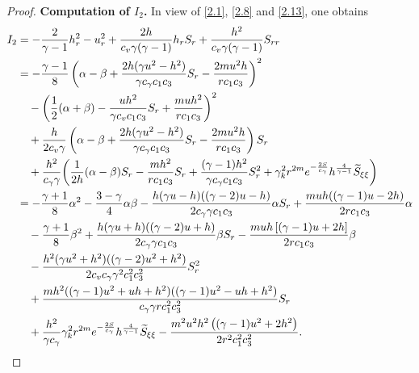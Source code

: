 \documentclass[11pt,reqno]{article}
\numberwithin{equation}{section}
\begin{document}
\begin{proof}
\noindent\textbf{Computation of $I_2$.}
In view of \eqref{2.1}, \eqref{2.8} and \eqref{2.13}, one obtains
\begin{align}
I_2 &=-\frac{2}{\gamma-1}h_r^2-u_r^2+\frac{2h}{c_v\gamma(\gamma-1)}h_rS_r
  +\frac{h^2}{c_v\gamma(\gamma-1)}S_{rr}\nonumber\\
  &= -\frac{\gamma-1}{8} \left( \alpha-\beta + \frac{2h(\gamma u^2-h^2)}{\gamma c_\gamma c_1c_3} S_r - \frac{2m u^2 h}{r c_1 c_3} \right)^2 \nonumber\\
  &\quad -\left(\frac12(\alpha+\beta) - \frac{uh^2}{\gamma c_v c_1c_3} S_r + \frac{m u h^2}{r c_1 c_3} \right)^2 \nonumber\\
  &\quad + \frac{h}{2c_v \gamma} \left( \alpha-\beta + \frac{2h(\gamma u^2-h^2)}{\gamma c_\gamma c_1c_3} S_r - \frac{2m u^2 h}{r c_1 c_3} \right) S_r \nonumber\\
  &\quad + \frac{h^2}{c_{\gamma} \gamma } \bigg( \frac{1}{2h}(\alpha-\beta) S_r - \frac{m h^2}{r c_1 c_3} S_r + \frac{(\gamma-1) h^2}{\gamma c_\gamma c_1 c_3} S_r^2 + \gamma_k^2 r^{2m} e^{-\frac{2S}{c_\gamma}} h^{\frac{4}{\gamma-1}} \widetilde{S}_{\xi\xi} \bigg)\nonumber\\
  &=  -\frac{\gamma + 1}{8}\alpha^2 - \frac{3 - \gamma}{4}\alpha\beta - \frac{h(\gamma u - h)((\gamma - 2)u - h)}{2c_{\gamma} \gamma c_1 c_3}\alpha S_r + \frac{muh((\gamma - 1)u - 2h)}{2r c_1 c_3}\alpha  \nonumber\\
  &\quad-\frac{\gamma + 1}{8}\beta^2 + \frac{h(\gamma u + h)((\gamma - 2)u + h)}{2c_{\gamma} \gamma c_1 c_3}\beta S_r - \frac{muh\left[ (\gamma - 1)u + 2h \right]}{2r c_1 c_3}\beta \nonumber\\
  &\quad - \frac{h^2(\gamma u^2 + h^2)((\gamma - 2)u^2 + h^2)}{2c_v c_{\gamma} \gamma^2 c_1^2 c_3^2}S_r^2 \nonumber\\
  &\quad+\frac{mh^2((\gamma - 1)u^2 + uh + h^2)((\gamma - 1)u^2 - uh + h^2)}{c_{\gamma} \gamma r c_1^2 c_3^2}S_r \nonumber\\
   &\quad +  \frac{ h^2}{\gamma c_{\gamma} } \gamma_k^2 r^{2m} e^{-\frac{2S}{c_\gamma}} h^{\frac{4}{\gamma-1}}  \widetilde{S}_{\xi\xi}-\frac{m^2 u^2 h^2 \left( (\gamma - 1)u^2 + 2h^2 \right)}{2r^2 c_1^2 c_3^2}. \notag
\end{align}


\end{proof}
\end{document}
